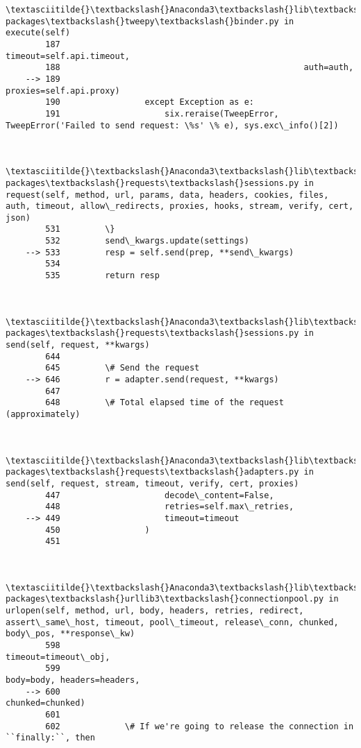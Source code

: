\documentclass[11pt]{article}
\begin{document}
\begin{Verbatim}[commandchars=\\\{\}]
        \textasciitilde{}\textbackslash{}Anaconda3\textbackslash{}lib\textbackslash{}site-packages\textbackslash{}tweepy\textbackslash{}binder.py in execute(self)
        187                                                 timeout=self.api.timeout,
        188                                                 auth=auth,
    --> 189                                                 proxies=self.api.proxy)
        190                 except Exception as e:
        191                     six.reraise(TweepError, TweepError('Failed to send request: \%s' \% e), sys.exc\_info()[2])
    

        \textasciitilde{}\textbackslash{}Anaconda3\textbackslash{}lib\textbackslash{}site-packages\textbackslash{}requests\textbackslash{}sessions.py in request(self, method, url, params, data, headers, cookies, files, auth, timeout, allow\_redirects, proxies, hooks, stream, verify, cert, json)
        531         \}
        532         send\_kwargs.update(settings)
    --> 533         resp = self.send(prep, **send\_kwargs)
        534 
        535         return resp
    

        \textasciitilde{}\textbackslash{}Anaconda3\textbackslash{}lib\textbackslash{}site-packages\textbackslash{}requests\textbackslash{}sessions.py in send(self, request, **kwargs)
        644 
        645         \# Send the request
    --> 646         r = adapter.send(request, **kwargs)
        647 
        648         \# Total elapsed time of the request (approximately)
    

        \textasciitilde{}\textbackslash{}Anaconda3\textbackslash{}lib\textbackslash{}site-packages\textbackslash{}requests\textbackslash{}adapters.py in send(self, request, stream, timeout, verify, cert, proxies)
        447                     decode\_content=False,
        448                     retries=self.max\_retries,
    --> 449                     timeout=timeout
        450                 )
        451 
    

        \textasciitilde{}\textbackslash{}Anaconda3\textbackslash{}lib\textbackslash{}site-packages\textbackslash{}urllib3\textbackslash{}connectionpool.py in urlopen(self, method, url, body, headers, retries, redirect, assert\_same\_host, timeout, pool\_timeout, release\_conn, chunked, body\_pos, **response\_kw)
        598                                                   timeout=timeout\_obj,
        599                                                   body=body, headers=headers,
    --> 600                                                   chunked=chunked)
        601 
        602             \# If we're going to release the connection in ``finally:``, then
    


\end{Verbatim}
\end{document}
